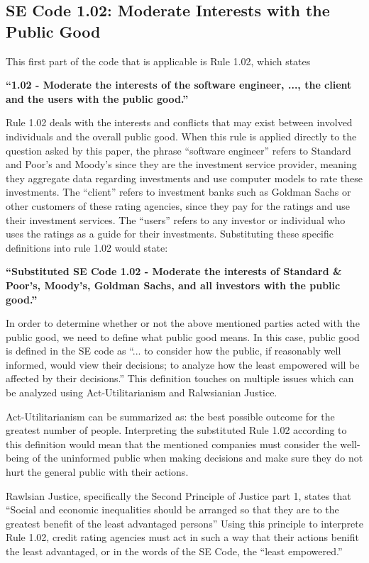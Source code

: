 \documentclass[11pt]{article}
\begin{document}
\begin{multicols}{2}
\subsection{SE Code 1.02: Moderate Interests with the Public Good}
This first part of the code that is applicable is Rule 1.02, which states
 

   \textbf{``1.02 - Moderate the interests of the software engineer, ..., the client and the users with the public good.''}


Rule 1.02 deals with the interests and conflicts that may exist between involved individuals and the overall public good.  When this rule is applied directly to the question asked by this paper, the phrase ``software engineer'' refers to Standard and Poor's and Moody's since they are the investment service provider, meaning they aggregate data regarding investments and use computer models to rate these investments. The ``client'' refers to investment banks such as Goldman Sachs or other customers of these rating agencies, since they pay for the ratings and use their investment services.  The ``users'' refers to any investor or individual who uses the ratings as a guide for their investments.  Substituting these specific definitions into rule 1.02 would state:


   \textbf{``Substituted SE Code 1.02 - Moderate the interests of Standard \& Poor's, Moody's, Goldman Sachs, and all investors with the public good.''}


In order to determine whether or not the above mentioned parties acted with the public good, we need to define what public good means.  In this case, public good is defined in the SE code as ``... to consider how the public, if reasonably well informed, would view their decisions; to analyze how the least empowered will be affected by their decisions.'' \cite{SEcode}  This definition touches on multiple issues which can be analyzed using Act-Utilitarianism and Ralwsianian Justice. 

Act-Utilitarianism can be summarized as: the best possible outcome for the greatest number of people.\cite{utility}  Interpreting the substituted Rule 1.02 according to this definition would mean that the mentioned companies must consider the well-being of the uninformed public when making decisions and make sure they do not hurt the general public with their actions. 

Rawlsian Justice, specifically the Second Principle of Justice part 1, states that ``Social and economic inequalities should be arranged so that they are to the greatest benefit of the least advantaged persons'' \cite{rawlsian} Using this principle to interprete Rule 1.02, credit rating agencies must act in such a way that their actions benifit the least advantaged, or in the words of the SE Code, the ``least empowered.''  


\end{multicols}
\end{document}
